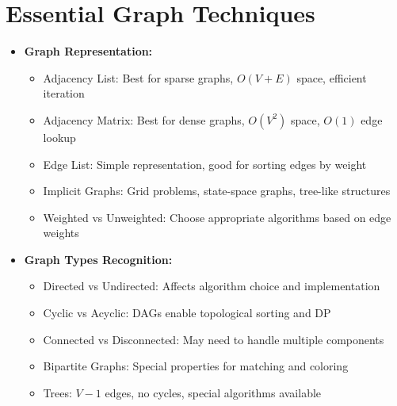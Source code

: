 \documentclass[a4paper,10pt]{book}
\begin{document}
\chapter{Essential Graph Techniques}
\label{sec:graph}
\begin{itemize}[leftmargin=*]
    \item \textbf{Graph Representation:}
    \begin{itemize}
        \item Adjacency List: Best for sparse graphs, $O(V + E)$ space, efficient iteration
        \item Adjacency Matrix: Best for dense graphs, $O(V^2)$ space, $O(1)$ edge lookup
        \item Edge List: Simple representation, good for sorting edges by weight
        \item Implicit Graphs: Grid problems, state-space graphs, tree-like structures
        \item Weighted vs Unweighted: Choose appropriate algorithms based on edge weights
    \end{itemize}

    \item \textbf{Graph Types Recognition:}
    \begin{itemize}
        \item Directed vs Undirected: Affects algorithm choice and implementation
        \item Cyclic vs Acyclic: DAGs enable topological sorting and DP
        \item Connected vs Disconnected: May need to handle multiple components
        \item Bipartite Graphs: Special properties for matching and coloring
        \item Trees: $V-1$ edges, no cycles, special algorithms available
    \end{itemize}
\end{itemize}
\end{document}
